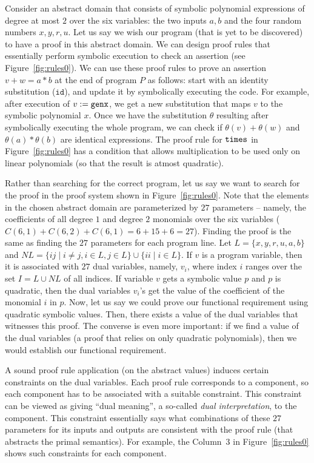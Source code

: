 \documentclass[preprint]{sig-alternate-05-2015}
\begin{document}
Consider an abstract domain that consists of symbolic polynomial expressions
of degree at most $2$ over the six variables: the two inputs $a,b$ and the
four random numbers $x,y,r,u$.
Let us say we wish our program (that is yet to be discovered)
to have a proof in this abstract domain.  
We can design proof rules that essentially perform
symbolic execution to check an assertion 
(see Figure~\ref{fig:rules0}).
We can use these proof rules to prove an assertion $v+w=a*b$ 
at the end of program $P$ as follows:
start with an identity substitution ($\mathtt{id}$), and update
it by symbolically executing the code. For example, after execution
of $v := \mbox{${\mathtt{genx}}$}$, we get a new substitution that maps $v$ to the symbolic
polynomial $x$.  Once we have the substitution $\theta$ resulting
after symbolically executing the whole program, we can check if 
$\theta(v)+\theta(w)$ and $\theta(a)*\theta(b)$ are identical expressions.
The proof rule for $\mbox{${\mathtt{times}}$}$ in Figure~\ref{fig:rules0} has a condition
that allows multiplication to be used only on linear polynomials (so that
the result is atmost quadratic).

Rather than searching for the correct program, let us say we want to
search for the proof in the proof system shown in Figure~\ref{fig:rules0}.  
Note that the
elements in the chosen abstract domain are parameterized
by $27$ parameters -- namely, the coefficients of all degree $1$ and degree $2$
monomials over the six variables ($C(6,1) + C(6,2) + C(6,1) = 6 + 15 + 6 = 27$).
Finding the proof is the same as finding the $27$ parameters for each program
line.
Let $L = \{x,y,r,u,a,b\}$ and $NL = \{ij \mid i\neq j, i\in L, j\in L\}\cup \{ii \mid i\in L\}$.
If $v$ is a program variable, then it is associated with
$27$ dual  variables, namely, $v_i$, where index $i$ ranges over the set
$I = L\cup NL$ of all indices. If variable $v$ gets a symbolic value
$p$ and $p$ is quadratic, then
the dual variables $v_i$'s get the value of the coefficient of the
monomial $i$ in $p$.
Now, let us say we could prove our functional requirement using quadratic
symbolic values.  Then, there exists a value of the dual variables that
witnesses this proof.  The converse is even more important: if
we find a value of the dual variables (a proof that relies on only
quadratic polynomials), then we would establish our functional requirement.

A sound proof rule application (on the abstract values) 
induces certain constraints on the dual variables.
Each proof rule corresponds to a component, so 
each component has to be associated with a suitable
constraint.  This constraint can be viewed as giving
``dual meaning'', a so-called {\em{dual interpretation}},
to the component.  This constraint essentially
says what combinations of these $27$
parameters for its inputs and outputs are consistent with the 
proof rule (that abstracts the primal semantics).
For example, the Column~$3$ in Figure~\ref{fig:rules0} shows
such constraints for each component.
\end{document}
